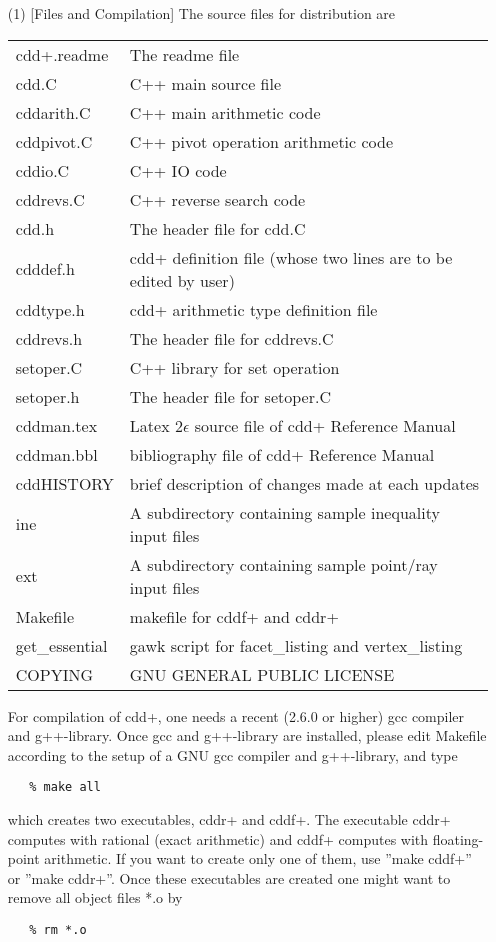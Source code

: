 \documentclass[11pt]{article}
\begin{document}
\begin{itemize}
\item[(1)] [Files and Compilation] The source files for distribution are

\begin{tabular}{ll}
     cdd+.readme  & The readme file\\
     cdd.C       & C++ main source file\\
     cddarith.C  & C++ main arithmetic code\\
     cddpivot.C  & C++ pivot operation arithmetic code\\
     cddio.C     & C++ IO code\\ 
     cddrevs.C   & C++ reverse search code\\ 
     cdd.h       & The header file for cdd.C\\
     cdddef.h    & cdd+ definition file (whose two lines are to be edited by user)\\
     cddtype.h   & cdd+ arithmetic type definition file\\
     cddrevs.h   & The header file for cddrevs.C\\
     setoper.C   & C++ library for set operation\\
     setoper.h   & The header file for setoper.C \\
     cddman.tex  & Latex 2$\epsilon$ source file of cdd+ Reference Manual\\
     cddman.bbl  & bibliography file of cdd+ Reference Manual\\
     cddHISTORY  & brief description of changes made at each updates\\
     ine         & A subdirectory containing sample inequality input  files\\
     ext         & A subdirectory containing sample point/ray input files\\
     Makefile  & makefile for cddf+ and cddr+\\
     get\_essential  & gawk script for facet\_listing and vertex\_listing \\
     COPYING     & GNU GENERAL PUBLIC LICENSE\\
\end{tabular}

\noindent
For compilation of cdd+, one needs a recent (2.6.0 or higher) gcc compiler
and g++-library.   Once gcc and g++-library are installed, 
please edit Makefile according to the setup of a GNU gcc compiler and g++-library,
 and type
\begin{verbatim}
   % make all
\end{verbatim}
which creates two executables, cddr+ and cddf+.  The executable
cddr+ computes with rational (exact arithmetic) and cddf+ computes
with floating-point arithmetic.  If you want to create only one of
them, use ''make cddf+'' or ''make cddr+''.  Once these executables are 
created one might want to remove all object files *.o by
\begin{verbatim}
   % rm *.o
\end{verbatim}


\end{itemize}
\end{document}
